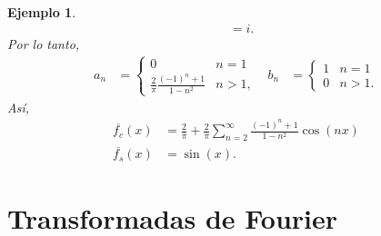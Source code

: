 \documentclass[11pt,letterpaper]{report}
\newtheorem{example}[defn]{Ejemplo}
\newcommand\<{\langle}
\renewcommand\>{\rangle}
\begin{document}
\begin{example}
\begin{align*}
    &=i.
  \end{align*}
  Por lo tanto,
  \begin{align*}
    a_n
    &=
    \begin{cases}
      0 & n=1 \\
      \frac{2}{\pi}\frac{(-1)^{n}+1}{1-n^{2}} & n>1,
    \end{cases}
    &
    b_n
    &=
    \begin{cases}
      1 & n=1 \\
      0 & n>1.
    \end{cases}
  \end{align*}
  Así,
  \begin{align*}
    \overline{f_c}(x)
    &=
    \frac{2}{\pi}
    +
    \frac{2}{\pi}
    \sum_{n=2}^{\infty}\frac{(-1)^{n}+1}{1-n^{2}}\cos(nx) \\
    \overline{f_s}(x)
    &= \sin(x).
  \end{align*}
\end{example}

\section{Transformadas de Fourier}
\end{document}
